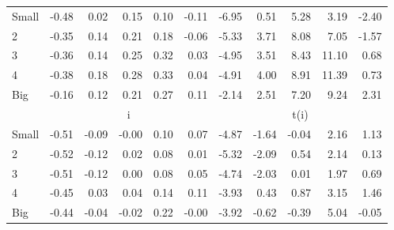 \begin{table}[!ht]
\begin{tabular}{lrrrrrrrrrr}
    \\
      \cmidrule(r){2-6} \cmidrule(r){7-11}

    Small   & -0.48  & 0.02  & 0.15  & 0.10  & -0.11  & -6.95  & 0.51  & 5.28  & 3.19  & -2.40  \\
         2  & -0.35  & 0.14  & 0.21  & 0.18  & -0.06  & -5.33  & 3.71  & 8.08  & 7.05  & -1.57  \\
         3  & -0.36  & 0.14  & 0.25  & 0.32  & 0.03  & -4.95  & 3.51  & 8.43  & 11.10  & 0.68  \\
         4  & -0.38  & 0.18  & 0.28  & 0.33  & 0.04  & -4.91  & 4.00  & 8.91  & 11.39  & 0.73  \\
    Big     & -0.16  & 0.12  & 0.21  & 0.27  & 0.11  & -2.14  & 2.51  & 7.20  & 9.24  & 2.31  \\

  
    
      & \multicolumn{5}{c}{i} & \multicolumn{5}{c}{t(i)}
    
    \\
      \cmidrule(r){2-6} \cmidrule(r){7-11}

    Small   & -0.51  & -0.09  & -0.00  & 0.10  & 0.07  & -4.87  & -1.64  & -0.04  & 2.16  & 1.13  \\
         2  & -0.52  & -0.12  & 0.02  & 0.08  & 0.01  & -5.32  & -2.09  & 0.54  & 2.14  & 0.13  \\
         3  & -0.51  & -0.12  & 0.00  & 0.08  & 0.05  & -4.74  & -2.03  & 0.01  & 1.97  & 0.69  \\
         4  & -0.45  & 0.03  & 0.04  & 0.14  & 0.11  & -3.93  & 0.43  & 0.87  & 3.15  & 1.46  \\
    Big     & -0.44  & -0.04  & -0.02  & 0.22  & -0.00  & -3.92  & -0.62  & -0.39  & 5.04  & -0.05  \\

  

  \bottomrule
\end{tabular}
\label{tbl:25_Size_Prior_FF2015}
\end{table}